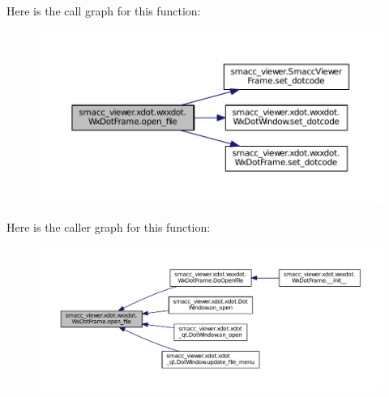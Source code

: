 Here is the call graph for this function\+:
\nopagebreak
\begin{figure}[H]
\begin{center}
\leavevmode
\includegraphics[width=350pt]{classsmacc__viewer_1_1xdot_1_1wxxdot_1_1WxDotFrame_ae2b463edfd3e4156077b2dcd39d6f9b2_cgraph}
\end{center}
\end{figure}




Here is the caller graph for this function\+:
\nopagebreak
\begin{figure}[H]
\begin{center}
\leavevmode
\includegraphics[width=350pt]{classsmacc__viewer_1_1xdot_1_1wxxdot_1_1WxDotFrame_ae2b463edfd3e4156077b2dcd39d6f9b2_icgraph}
\end{center}
\end{figure}


